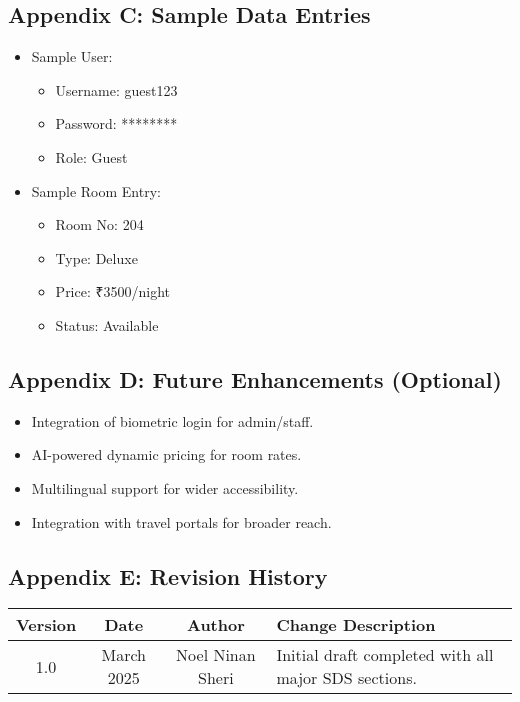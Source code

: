 \documentclass[a4paper,12pt]{article}
\begin{document}
\subsection{Appendix C: Sample Data Entries}
\begin{itemize}
    \item Sample User:
    \begin{itemize}
        \item Username: guest123  
        \item Password: ********  
        \item Role: Guest  
    \end{itemize}
    \item Sample Room Entry:
    \begin{itemize}
        \item Room No: 204  
        \item Type: Deluxe  
        \item Price: ₹3500/night  
        \item Status: Available  
    \end{itemize}
\end{itemize}

\subsection{Appendix D: Future Enhancements (Optional)}
\begin{itemize}
    \item Integration of biometric login for admin/staff.  
    \item AI-powered dynamic pricing for room rates.  
    \item Multilingual support for wider accessibility.  
    \item Integration with travel portals for broader reach.
\end{itemize}

\subsection{Appendix E: Revision History}
\begin{tabular}{|c|c|c|p{7cm}|}
\hline
\textbf{Version} & \textbf{Date} & \textbf{Author} & \textbf{Change Description} \\
\hline
1.0 & March 2025 & Noel Ninan Sheri & Initial draft completed with all major SDS sections. \\
\hline
\end{tabular}
\end{document}
